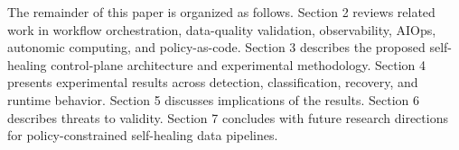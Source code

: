 The remainder of this paper is organized as follows. Section 2 reviews related work in workflow orchestration, data-quality validation, observability, AIOps, autonomic computing, and policy-as-code. Section 3 describes the proposed self-healing control-plane architecture and experimental methodology. Section 4 presents experimental results across detection, classification, recovery, and runtime behavior. Section 5 discusses implications of the results. Section 6 describes threats to validity. Section 7 concludes with future research directions for policy-constrained self-healing data pipelines.


